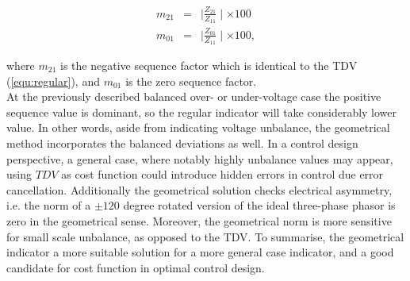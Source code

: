             \begin{equation}
                \begin{array}{rcl}
                       m_{21}&=&\mid\frac{Z_{21}}{Z_{11}}\mid\times100\\
                       m_{01}&=&\mid\frac{Z_{01}}{Z_{11}}\mid\times100,
                \end{array}
                \label{equ:factor}
            \end{equation}

            where $m_{21}$ is the negative sequence factor which is identical to the TDV (\ref{equ:regular}), and $m_{01}$ is the zero sequence factor.\\
            At the previously described balanced over- or under-voltage case the positive sequence value is dominant, so the regular indicator will take considerably lower value. In other words, aside from indicating voltage unbalance, the geometrical method incorporates the balanced deviations as well. In a control design perspective, a general case, where notably highly unbalance values may appear, using $TDV$ as cost function could introduce hidden errors in control due error cancellation. Additionally the geometrical solution checks electrical asymmetry, i.e. the norm of a $\pm120$ degree rotated version of the ideal three-phase phasor is zero in the geometrical sense. Moreover, the geometrical norm is more sensitive for small scale unbalance, as opposed to the TDV. To summarise, the geometrical indicator a more suitable solution for a more general case indicator, and a good candidate for cost function in optimal control design.

